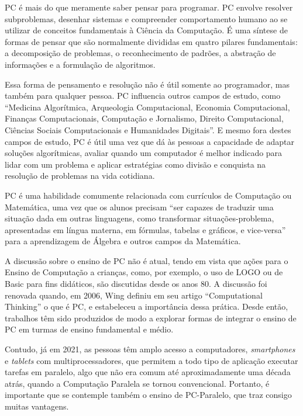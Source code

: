 \documentclass[conference]{IEEEtran}
\begin{document}
PC é mais do que meramente saber pensar para programar. PC envolve resolver subproblemas, desenhar sistemas e compreender comportamento humano ao se utilizar de conceitos fundamentais à Ciência da Computação\cite{b2}. É uma síntese de formas de pensar que são normalmente divididas em quatro pilares fundamentais: a decomposição de problemas, o reconhecimento de padrões, a abstração de informações e a formulação de algoritmos\cite{b6}.

 Essa forma de pensamento e resolução não é útil somente ao programador, mas também para qualquer pessoa. PC influencia outros campos de estudo, como ``Medicina Algorítmica, Arqueologia Computacional, Economia Computacional, Finanças Computacionais, Computação e Jornalismo, Direito Computacional, Ciências Sociais Computacionais e Humanidades Digitais\cite{b7}''. E mesmo fora destes campos de estudo, PC é útil uma vez que dá às pessoas a capacidade de adaptar soluções algorítmicas, avaliar quando um computador é melhor indicado para lidar com um problema e aplicar estratégias como divisão e conquista na resolução de problemas na vida cotidiana\cite{b7}.

PC é uma habilidade comumente relacionada com currículos de Computação\cite{b8} ou Matemática, uma vez que os alunos precisam ``ser capazes de traduzir uma situação dada em outras linguagens, como transformar situações-problema, apresentadas em língua materna, em fórmulas, tabelas e gráficos, e vice-versa''\cite{b4} para a aprendizagem de Álgebra e outros campos da Matemática. 

A discussão sobre o ensino de PC não é atual, tendo em vista que ações para o Ensino de Computação a crianças, como, por exemplo, o uso de LOGO ou de Basic para fins didáticos, são discutidas desde os anos 80\cite{b9}. A discussão foi renovada quando, em 2006, Wing definiu em seu artigo ``Computational Thinking'' o que é PC, e estabeleceu a importância dessa prática. Desde então, trabalhos têm sido produzidos de modo a explorar formas de integrar o ensino de PC em turmas de ensino fundamental e médio\cite{b1}\cite{b10}\cite{b11}\cite{b12}.

Contudo, já em 2021, as pessoas têm amplo acesso a computadores, \textit{smartphones} e \textit{tablets} com multiprocessadores, que permitem a todo tipo de aplicação executar tarefas em paralelo, algo que não era comum até aproximadamente uma década atrás, quando a Computação Paralela se tornou convencional. Portanto, é importante que se contemple também o ensino de PC-Paralelo, que traz consigo muitas vantagens\cite{b5}.
\end{document}
